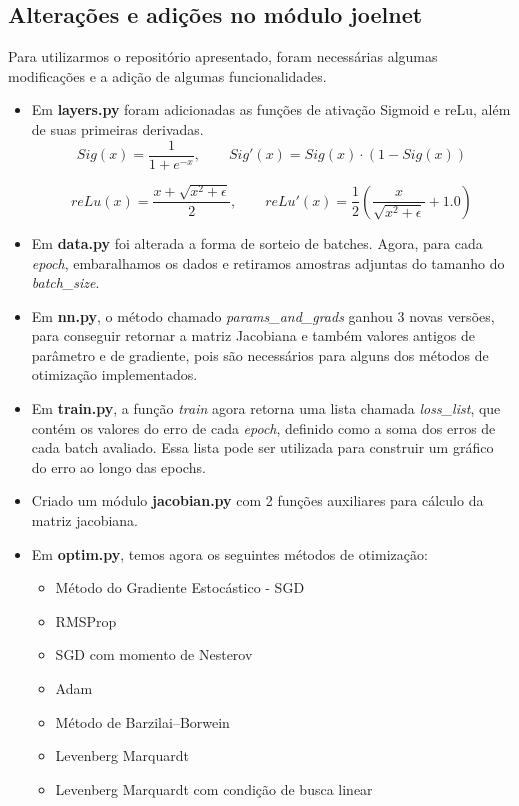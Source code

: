 \documentclass[11pt]{article}
\begin{document}
\subsection*{Alterações e adições no módulo joelnet}
Para utilizarmos o repositório apresentado, foram necessárias algumas modificações e a adição de algumas funcionalidades.
\begin{itemize}
\item Em \textbf{layers.py} foram adicionadas as funções de ativação Sigmoid e reLu, além de suas primeiras derivadas.
$$Sig(x) = \frac{1}{1 + e^{-x}} ,\qquad Sig'(x) = Sig(x)\cdot (1 - Sig(x)) $$

$$reLu(x) = \frac{x + \sqrt{x^2 + \epsilon}}{2} ,\qquad reLu'(x) = \frac{1}{2}\left(\frac{x}{\sqrt{x^2 + \epsilon}} + 1.0\right)$$

\item Em \textbf{data.py} foi alterada a forma de sorteio de batches. Agora, para cada \textit{epoch}, embaralhamos os dados e retiramos amostras adjuntas do tamanho do \textit{batch\_size}. 
\item Em \textbf{nn.py}, o método chamado \textit{params\_and\_grads} ganhou 3 novas versões, para conseguir retornar a matriz Jacobiana e também valores antigos de parâmetro e de gradiente, pois são necessários para alguns dos métodos de otimização implementados.
\item Em \textbf{train.py}, a função \textit{train} agora retorna uma lista chamada \textit{loss\_list}, que contém os valores do erro de cada \textit{epoch}, definido como a soma dos erros de cada batch avaliado. Essa lista pode ser utilizada para construir um gráfico do erro ao longo das epochs.
\item Criado um módulo \textbf{jacobian.py} com 2 funções auxiliares para cálculo da matriz jacobiana.
\item Em \textbf{optim.py}, temos agora os seguintes métodos de otimização:
\begin{itemize}
	\item Método do Gradiente Estocástico - SGD
	\item RMSProp
	\item SGD com momento de Nesterov
	\item Adam
	\item Método de Barzilai–Borwein
	\item Levenberg Marquardt
	\item Levenberg Marquardt com condição de busca linear
\end{itemize}




\end{itemize}
\end{document}
